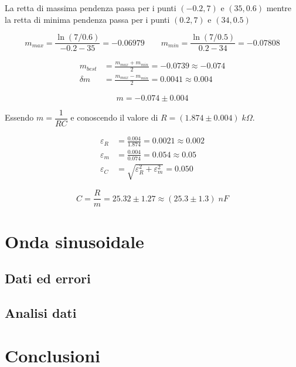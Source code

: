 \documentclass[11pt, a4paper]{article}
\numberwithin{equation}{section} %
\begin{document}
La retta di massima pendenza passa per i punti \((-0.2, 7)\) e \((35, 0.6)\) mentre la retta di minima pendenza passa per i punti \((0.2, 7)\) e \((34, 0.5)\)

\begin{equation*}
    m_{max} = \frac{\ln(7/0.6)}{- 0.2 - 35} = - 0.06979
    \qquad
    m_{min} = \frac{\ln(7/0.5)}{0.2 - 34} = - 0.07808
\end{equation*}

\begin{align*}
    m_{best} &= \frac{m_{max} + m_{min}}{2} = - 0.0739 \approx - 0.074 \\
    \delta m &= \frac{m_{max} - m_{min}}{2} = 0.0041 \approx 0.004
\end{align*}

\begin{equation}
    m = - 0.074 \pm 0.004
\end{equation}

Essendo \(m = \dfrac{1}{RC}\) e conoscendo il valore di \(R = (1.874 \pm 0.004) \; \unit{k\Omega}\).

\begin{align*}
    \varepsilon_R &= \frac{0.004}{1.874} = 0.0021 \approx 0.002 \\
    \varepsilon_m &= \frac{0.004}{0.074} = 0.054 \approx 0.05 \\
    \varepsilon_C &= \sqrt{\varepsilon_R^{2} + \varepsilon_m^{2}} = 0.050 %
\end{align*}

\begin{equation}
    C = \frac{R}{m} = 25.32 \pm 1.27 \approx (25.3 \pm 1.3) \; \unit{nF}
\end{equation}

\section{Onda sinusoidale}

\subsection{Dati ed errori}

\subsection{Analisi dati}

\section{Conclusioni}
\end{document}

